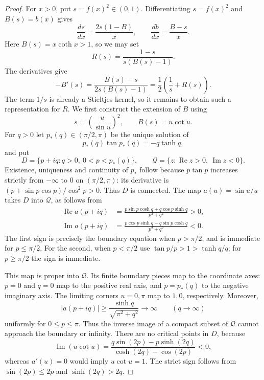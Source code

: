 \begin{proof}
For $x>0$, put $s=f(x)^2\in(0,1)$. Differentiating $s=f(x)^2$ and
$B(s)=b(x)$ gives
\[
 \frac{ds}{dx}=\frac{2s(1-B)}{x},\qquad
 \frac{db}{dx}=\frac{B-s}{x}.
\]
Here $B(s)=x\coth x>1$, so we may set
\[
 R(s)=\frac{1-s}{s(B(s)-1)}.
\]
The derivatives give
\begin{equation}\label{int:B-derivative}
 -B'(s)=\frac{B(s)-s}{2s(B(s)-1)}
       =\frac12\left(\frac1s+R(s)\right).
\end{equation}
The term $1/s$ is already a Stieltjes kernel, so it remains to obtain
such a representation for $R$. We first construct the extension of $B$
using
\begin{equation}\label{int:u-parametrization}
 s=\left(\frac{u}{\sin u}\right)^2,\qquad B(s)=u\cot u.
\end{equation}
For $q>0$ let $p_*(q)\in(\pi/2,\pi)$ be the unique solution of
\[
 p_*(q)\tan p_*(q)=-q\tanh q,
\]
and put
\[
 D=\{p+iq:q>0,\ 0<p<p_*(q)\},\qquad
 \mathcal Q=\{z:\operatorname{Re}z>0,\ \operatorname{Im}z<0\}.
\]
Existence, uniqueness and continuity of $p_*$ follow because
$p\tan p$ increases strictly from $-\infty$ to $0$ on $(\pi/2,\pi)$:
its derivative is $(p+\sin p\cos p)/\cos^2p>0$.
Thus $D$ is connected.  The map $a(u)=\sin u/u$ takes $D$ into
$\mathcal Q$, as follows from
\begin{align*}
 \operatorname{Re}a(p+iq)
 &=\frac{p\sin p\cosh q+q\cos p\sinh q}{p^2+q^2}>0,\\
 \operatorname{Im}a(p+iq)
 &=\frac{p\cos p\sinh q-q\sin p\cosh q}{p^2+q^2}<0.
\end{align*}
The first sign is precisely the boundary equation when $p>\pi/2$,
and is immediate for $p\le\pi/2$.  For the second, when $p<\pi/2$ use
$\tan p/p>1>\tanh q/q$; for $p\ge\pi/2$ the sign is immediate.

This map is proper into $\mathcal Q$.  Its finite boundary pieces map
to the coordinate axes: $p=0$ and $q=0$ map to the positive real axis,
and $p=p_*(q)$ to the negative imaginary axis.  The limiting corners
$u=0,\pi$ map to $1,0$, respectively.  Moreover,
\[
 |a(p+iq)|\ge\frac{\sinh q}{\sqrt{\pi^2+q^2}}\longrightarrow\infty
 \qquad(q\longrightarrow\infty)
\]
uniformly for $0\le p\le\pi$.  Thus the inverse image of a compact
subset of $\mathcal Q$ cannot approach the boundary or infinity.
There are no critical points in $D$, because
\begin{equation}\label{int:anti-pick-sign}
 \operatorname{Im}(u\cot u)
 =\frac{q\sin(2p)-p\sinh(2q)}{\cosh(2q)-\cos(2p)}<0,
\end{equation}
whereas $a'(u)=0$ would imply $u\cot u=1$.
The strict sign follows from $\sin(2p)\le2p$ and $\sinh(2q)>2q$.


\end{proof}

